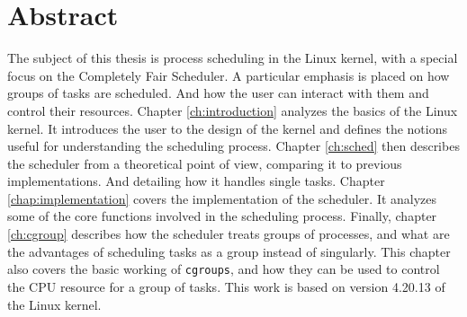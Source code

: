 \chapter{Abstract}
The subject of this thesis is process scheduling in the Linux kernel, with a special focus on the Completely Fair Scheduler. A particular emphasis is placed on how groups of tasks are scheduled. And how the user can interact with them and control their resources. Chapter \ref{ch:introduction} analyzes the basics of the Linux kernel. It introduces the user to the design of the kernel and defines the notions useful for understanding the scheduling process. Chapter \ref{ch:sched} then describes the scheduler from a theoretical point of view, comparing it to previous implementations. And detailing how it handles single tasks. Chapter \ref{chap:implementation} covers the implementation of the scheduler. It analyzes some of the core functions involved in the scheduling process. Finally, chapter \ref{ch:cgroup} describes how the scheduler treats groups of processes, and what are the advantages of scheduling tasks as a group instead of singularly. This chapter also covers the basic working of \verb|cgroups|, and how they can be used to control the CPU resource for a group of tasks. This work is based on version 4.20.13 of the Linux kernel.
